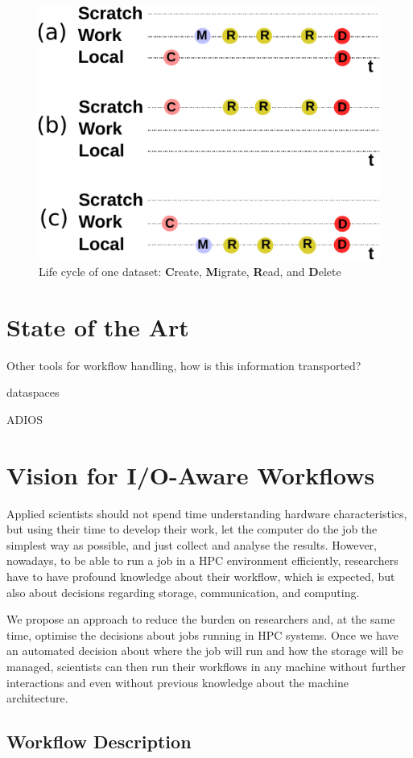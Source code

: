 \documentclass[a4paper]{article}
\begin{document}
\begin{figure}[H]
  \centering
  \includegraphics[width=0.6\columnwidth]{lifecycle}
  \caption{Life cycle of one dataset: \textbf{C}reate, \textbf{M}igrate, \textbf{R}ead, and \textbf{D}elete}
  \label{fig:lifecycle}
\end{figure}


\section{State of the Art}

Other tools for workflow handling, how is this information transported?

dataspaces

ADIOS


\section{Vision for I/O-Aware Workflows}

Applied scientists should not spend time understanding hardware characteristics, but using their time to develop their work, let the computer do the job the simplest way as possible, and just collect and analyse the results.
However, nowadays, to be able to run a job in a HPC environment efficiently, researchers have to have profound knowledge about their workflow, which is expected, but also about decisions regarding storage, communication, and computing.

We propose an approach to reduce the burden on researchers and, at the same time, optimise the decisions about jobs running in HPC systems.
Once we have an automated decision about where the job will run and how the storage will be managed, scientists can then run their workflows in any machine without further interactions and even without previous knowledge about the machine architecture.


\subsection{Workflow Description}
\end{document}
